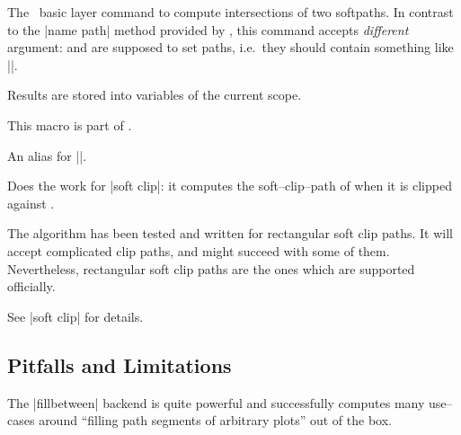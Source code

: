 \begin{command}{\pgfintersectionofpaths{}}
	The \pgfname\ basic layer command to compute intersections of two softpaths. In contrast to the |name path| method provided by \tikzname, this command accepts \emph{different} argument:  and  are supposed to set paths, i.e.\ they should contain something like |\pgfsetpath{\somesoftpath}|.

	Results are stored into variables of the current scope.

	This macro is part of \pgfname.
\end{command}

\begin{command}{\tikzpathintersectionsegments{}}
	An alias for ||.
\end{command}

\begin{command}{\pgfpathcomputesoftclippath{}}
	Does the work for |soft clip|: it computes the soft--clip--path of  when it is clipped against .
	
	The algorithm has been tested and written for rectangular soft clip paths. It will accept complicated clip paths, and might succeed with some of them. Nevertheless, rectangular soft clip paths are the ones which are supported officially.

	See |soft clip| for details.
\end{command}

\subsection{Pitfalls and Limitations}

The |fillbetween| backend is quite powerful and successfully computes many use--cases around ``filling path segments of arbitrary plots'' out of the box.

